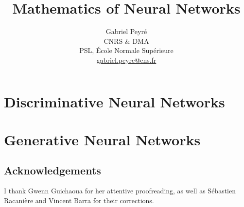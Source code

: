 \documentclass[11pt]{book}
\title{Mathematics of Neural Networks}
\author{%
\begin{tabular}{c}
	Gabriel Peyr{\'e} \\ CNRS \& DMA \\
	 PSL, \'Ecole Normale Sup\'erieure \\
	 \url{gabriel.peyre@ens.fr}
\end{tabular}
}
\date{}
\begin{document}
\maketitle

\chapter{Discriminative Neural Networks}



\chapter{Generative Neural Networks}



\section*{Acknowledgements}

I thank Gwenn Guichaoua for her attentive proofreading, as well as S\'ebastien Racani\`ere and Vincent Barra for their corrections.



\end{document}
